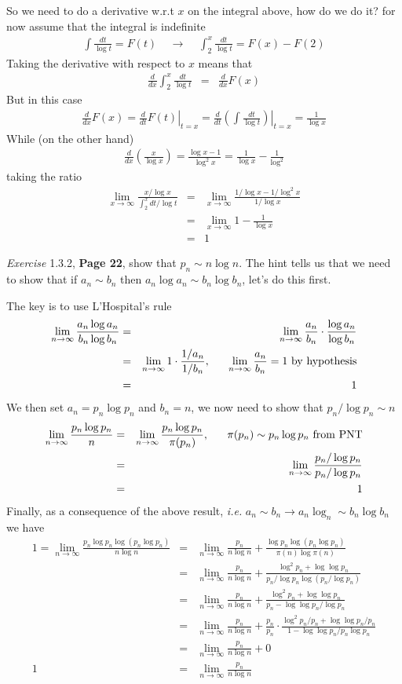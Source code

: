 \documentclass[aps,preprint,preprintnumbers,nofootinbib,showpacs,prd]{revtex4-1}
\newcommand{\ie}{{\it i.e.} }
\newcommand{\nbea}{\begin{eqnarray*}}
\newcommand{\neea}{\end{eqnarray*}}
\begin{document}
So we need to do a derivative w.r.t $x$ on the integral above, how do we do it? for now assume that the integral is indefinite
%
\nbea
\int \frac{dt}{\log t} = F(t) ~~~~~ \longrightarrow ~~~~~ \int_2^x \frac{dt}{\log t} = F(x) - F(2)
\neea
%
Taking the derivative with respect to $x$ means that
%
\nbea
\frac{d}{dx} \int_2^x \frac{dt}{\log t} & = & \frac{d}{dx} F(x)
\neea
%
But in this case
%
\nbea
\frac{d}{dx} F(x) = \left.\frac{d}{dt}F(t) \right|_{t = x} = \left.\frac{d}{dt}\left(\int \frac{dt}{\log t}\right) \right|_{t = x} = \frac{1}{\log x}
\neea
%
While (on the other hand)
%
\nbea
\frac{d}{dx} \left ( \frac{x}{\log x} \right )  = \frac{\log x - 1}{\log^2 x} = \frac{1}{\log x} - \frac{1}{\log^2}
\neea
%
taking the ratio
%
\nbea
\lim_{x\to\infty} \frac{x/\log x}{\int_2^x dt/\log t} & = & \lim_{x\to\infty} \frac{1/\log x - 1/\log^2x}{1/\log x} \\
& = & \lim_{x\to\infty} 1 - \frac{1}{\log x} \\
& = & 1
\neea
%

{\it Exercise} 1.3.2, {\bf Page 22}, show that $p_n \sim n \log n$. The hint tells us that we need to show that if $a_n \sim b_n$ then $a_n \log a_n \sim b_n \log b_n$, let's do this first.

The key is to use L'Hospital's rule
%
\nbea
\lim_{n\to\infty} \frac{a_n\log a_n}{b_n\log b_n} & = & \lim_{n\to\infty} \frac{a_n}{b_n} \cdot \frac{\log a_n}{\log b_n} \\
& = & \lim_{n\to\infty} 1 \cdot \frac{1/a_n}{1/b_n}, ~~~~~  \lim_{n\to\infty} \frac{a_n}{b_n} = 1 {\rm~by~hypothesis}\\
& = & 1
\neea
%
We then set $a_n = p_n\log p_n$ and $b_n = n$, we now need to show that $p_n/\log p_n \sim n$
%
\nbea
\lim_{n\to\infty}\frac{p_n\log p_n}{n} & = & \lim_{n\to\infty}\frac{p_n\log p_n}{\pi(p_n)}, ~~~~~ \pi(p_n) \sim p_n\log p_n {\rm~from~PNT} \\
& = & \lim_{n\to\infty}\frac{p_n/\log p_n}{p_n/\log p_n} \\
& = & 1
\neea
%
Finally, as a consequence of the above result, \ie $a_n \sim b_n \to a_n\log _n \sim b_n \log b_n$ we have
%
\nbea
1 = \lim_{n\to\infty}\frac{p_n\log p_n\log(p_n\log p_n)}{n\log n} & = & \lim_{n\to\infty}\frac{p_n}{n\log n} + \frac{\log p_n\log(p_n\log p_n)}{\pi(n)\log \pi(n)} \\
& = & \lim_{n\to\infty}\frac{p_n}{n\log n} + \frac{\log^2 p_n + \log \log p_n}{p_n/\log p_n \log (p_n/\log p_n)} \\
& = & \lim_{n\to\infty}\frac{p_n}{n\log n} + \frac{\log^2 p_n + \log \log p_n}{p_n - \log \log p_n/\log p_n} \\
& = & \lim_{n\to\infty}\frac{p_n}{n\log n} + \frac{p_n}{p_n}\cdot\frac{\log^2 p_n/p_n + \log \log p_n/p_n}{1 - \log \log p_n/p_n\log p_n} \\
& = & \lim_{n\to\infty}\frac{p_n}{n\log n} + 0 \\
1 & = & \lim_{n\to\infty}\frac{p_n}{n\log n}
\neea
%
\end{document}
